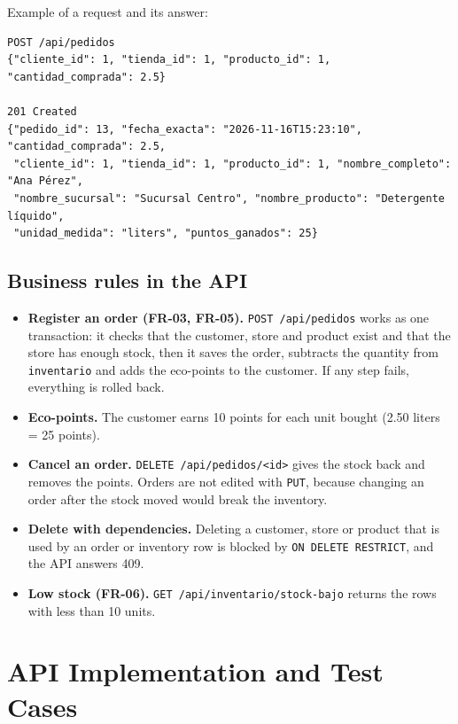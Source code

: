\documentclass[11pt]{article}
\renewcommand{\_}{\oldus\allowbreak}
\begin{document}
Example of a request and its answer:

\begin{lstlisting}
POST /api/pedidos
{"cliente_id": 1, "tienda_id": 1, "producto_id": 1, "cantidad_comprada": 2.5}

201 Created
{"pedido_id": 13, "fecha_exacta": "2026-11-16T15:23:10", "cantidad_comprada": 2.5,
 "cliente_id": 1, "tienda_id": 1, "producto_id": 1, "nombre_completo": "Ana Pérez",
 "nombre_sucursal": "Sucursal Centro", "nombre_producto": "Detergente líquido",
 "unidad_medida": "liters", "puntos_ganados": 25}
\end{lstlisting}

\subsection{Business rules in the API}

\begin{itemize}[itemsep=0.2em]
  \item \textbf{Register an order (FR-03, FR-05).} \texttt{POST /api/pedidos} works as one
  transaction: it checks that the customer, store and product exist and that the store has enough
  stock, then it saves the order, subtracts the quantity from \texttt{inventario} and adds the
  eco-points to the customer. If any step fails, everything is rolled back.
  \item \textbf{Eco-points.} The customer earns 10 points for each unit bought (2.50 liters = 25 points).
  \item \textbf{Cancel an order.} \texttt{DELETE /api/pedidos/<id>} gives the stock back and removes the points.
  Orders are not edited with \texttt{PUT}, because changing an order after the stock moved would break the inventory.
  \item \textbf{Delete with dependencies.} Deleting a customer, store or product that is used by
  an order or inventory row is blocked by \texttt{ON DELETE RESTRICT}, and the API answers 409.
  \item \textbf{Low stock (FR-06).} \texttt{GET /api/inventario/stock-bajo} returns the rows with less than 10 units.
\end{itemize}

\section{API Implementation and Test Cases}
\end{document}
